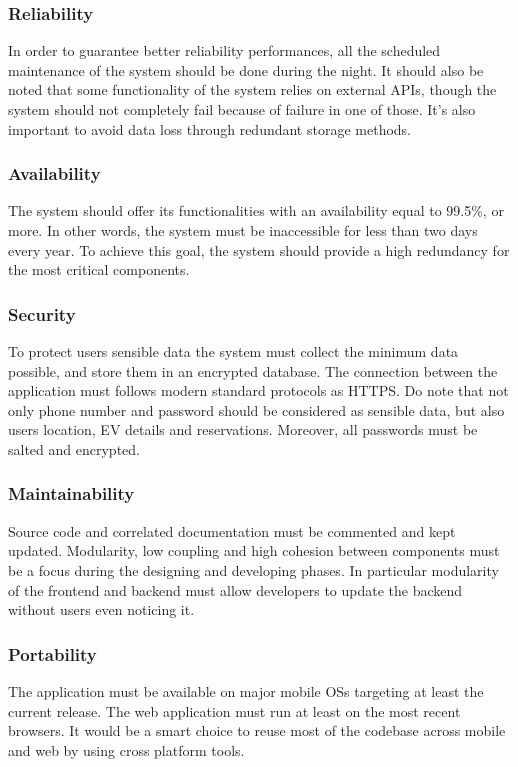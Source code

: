 \subsubsection{Reliability}
In order to guarantee better reliability performances, all
the scheduled maintenance of the system should be done during
the night.
It should also be noted that some functionality of the system relies on external APIs, though the system should not completely fail
because of failure in one of those. It's also important to avoid data loss through redundant storage methods.

\subsubsection{Availability}
The system should offer its functionalities with an availability
equal to 99.5\%, or more. In other words, the system must be inaccessible
for less than two days every year. To achieve this goal, the system should
provide a high redundancy for the most critical components.


\subsubsection{Security}
To protect users sensible data the system must collect the minimum data possible, and store them in an encrypted database.
The connection between the application must follows modern standard protocols as HTTPS. Do note that not only phone number and password should be considered as sensible data, but also users location, EV details and reservations.
Moreover, all passwords must be salted and encrypted.

\subsubsection{Maintainability}
Source code and correlated documentation must be commented and kept updated.
Modularity, low coupling and high cohesion between components must be a focus during the
designing and developing phases. In particular modularity of the frontend and backend must allow developers to update the backend without users even noticing it.

\subsubsection{Portability}
The application must be available on major mobile OSs targeting at least the current
release. The web application must run at least on the most recent
browsers. It would be a smart choice to reuse most of the codebase
across mobile and web by using cross platform tools.

